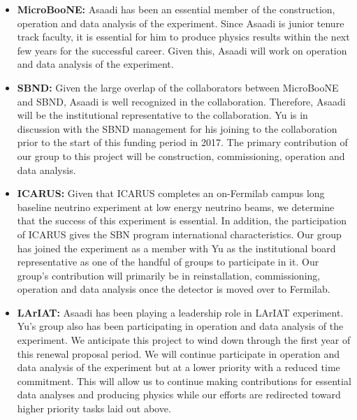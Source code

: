 \begin{itemize}
\begin{itemize}
\item{{\bf MicroBooNE:} Asaadi has been an essential member of the construction, operation and data analysis of the experiment.   Since Asaadi is junior tenure track faculty, it is essential for him to produce physics results within the next few years for the successful career.  Given this, Asaadi will work on operation and data analysis of the experiment.}
\item {{\bf SBND:} Given the large overlap of the collaborators between MicroBooNE and SBND, Asaadi is well recognized in the collaboration.  Therefore, Asaadi will be the institutional representative to the collaboration.  Yu is in discussion with the SBND management for his joining to the collaboration prior to the start of this funding period in 2017.  The primary contribution of our group to this project will be construction, commissioning, operation and data analysis.}
\item{{\bf ICARUS:} Given that ICARUS completes an on-Fermilab campus long baseline neutrino experiment at low energy neutrino beams, we determine that the success of this experiment is essential.  In addition, the participation of ICARUS gives the SBN program international characteristics.   Our group has joined the experiment as a member with Yu as the institutional board representative as one of the handful of groups to participate in it.   Our group’s contribution will primarily be in reinstallation, commissioning, operation and data analysis once the detector is moved over to Fermilab.}
\item{{\bf LArIAT:} Asaadi has been playing a leadership role in LArIAT experiment.  Yu’s group also has been participating in operation and data analysis of the experiment.   We anticipate this project to wind down through the first year of this renewal proposal period.  We will continue participate in operation and data analysis of the experiment but at a lower priority with a reduced time commitment.  This will allow us to continue making contributions for essential data analyses and producing physics while our efforts are redirected toward higher priority tasks laid out above.}
\end{itemize}

\end{itemize}
